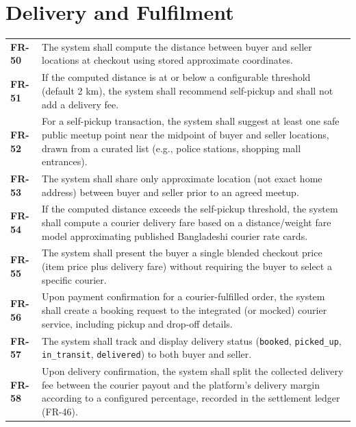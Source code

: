 \documentclass[11pt,a4paper]{report}
\newenvironment{reqtable}{\begin{longtable}{p{2.2cm}p{11.5cm}}}{\end{longtable}}
\begin{document}
\section{Delivery and Fulfilment}
\begin{reqtable}
\textbf{FR-50} & The system shall compute the distance between buyer and seller locations at checkout using stored approximate coordinates. \\
\textbf{FR-51} & If the computed distance is at or below a configurable threshold (default 2 km), the system shall recommend self-pickup and shall not add a delivery fee. \\
\textbf{FR-52} & For a self-pickup transaction, the system shall suggest at least one safe public meetup point near the midpoint of buyer and seller locations, drawn from a curated list (e.g., police stations, shopping mall entrances). \\
\textbf{FR-53} & The system shall share only approximate location (not exact home address) between buyer and seller prior to an agreed meetup. \\
\textbf{FR-54} & If the computed distance exceeds the self-pickup threshold, the system shall compute a courier delivery fare based on a distance/weight fare model approximating published Bangladeshi courier rate cards. \\
\textbf{FR-55} & The system shall present the buyer a single blended checkout price (item price plus delivery fare) without requiring the buyer to select a specific courier. \\
\textbf{FR-56} & Upon payment confirmation for a courier-fulfilled order, the system shall create a booking request to the integrated (or mocked) courier service, including pickup and drop-off details. \\
\textbf{FR-57} & The system shall track and display delivery status (\texttt{booked}, \texttt{picked\_up}, \texttt{in\_transit}, \texttt{delivered}) to both buyer and seller. \\
\textbf{FR-58} & Upon delivery confirmation, the system shall split the collected delivery fee between the courier payout and the platform's delivery margin according to a configured percentage, recorded in the settlement ledger (FR-46). \\
\end{reqtable}
\end{document}
